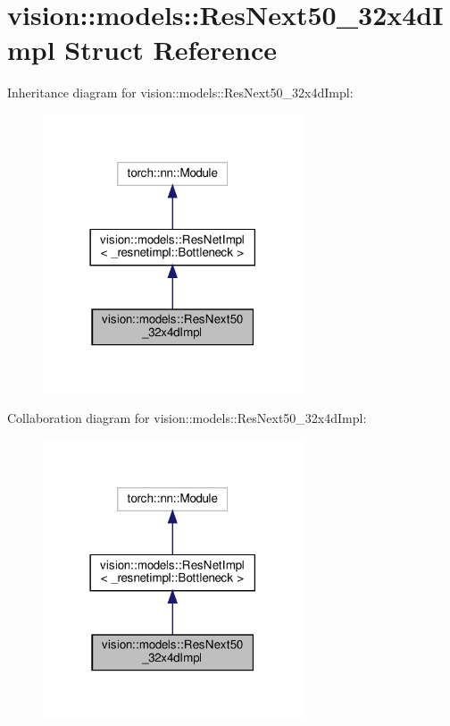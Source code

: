 \hypertarget{structvision_1_1models_1_1ResNext50__32x4dImpl}{}\section{vision\+:\+:models\+:\+:Res\+Next50\+\_\+32x4d\+Impl Struct Reference}
\label{structvision_1_1models_1_1ResNext50__32x4dImpl}


Inheritance diagram for vision\+:\+:models\+:\+:Res\+Next50\+\_\+32x4d\+Impl\+:
\nopagebreak
\begin{figure}[H]
\begin{center}
\leavevmode
\includegraphics[width=218pt]{structvision_1_1models_1_1ResNext50__32x4dImpl__inherit__graph}
\end{center}
\end{figure}


Collaboration diagram for vision\+:\+:models\+:\+:Res\+Next50\+\_\+32x4d\+Impl\+:
\nopagebreak
\begin{figure}[H]
\begin{center}
\leavevmode
\includegraphics[width=218pt]{structvision_1_1models_1_1ResNext50__32x4dImpl__coll__graph}
\end{center}
\end{figure}
